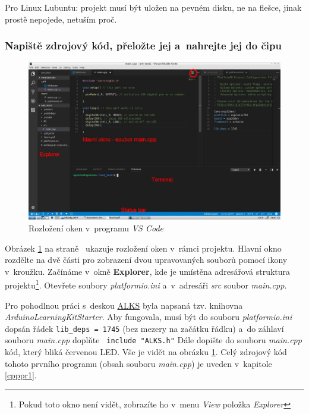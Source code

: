  Pro Linux Lubuntu: projekt musí být uložen na pevném disku, ne na flešce, jinak prostě nepojede, netuším proč.  
 
 \subsubsection{Napiště zdrojový kód, přeložte jej a~nahrejte jej do čipu}
 
 \begin{figure}[h]
 	\includegraphics[width=\textwidth]{soubory/rozlozeni2.jpg}
 	\caption{Rozložení oken v~programu {\it VS Code}} 
 	\label{fig:vsc_rozlozeni}
 \end{figure}	
 
 \hypertarget{explorer}{}
 Obrázek \ref{fig:vsc_rozlozeni} na straně~\pageref{fig:vsc_rozlozeni} ukazuje rozložení oken v~rámci projektu.
 Hlavní okno  rozdělte na dvě části pro zobrazení dvou upravovaných souborů pomocí ikony v~kroužku.
 Začínáme v~okně {\bf Explorer}, 
 kde je umístěna adresářová struktura projektu\footnote{Pokud toto okno není vidět, zobrazíte ho v~menu {\it View} položka {\it Explorer} }.
 Otevřete soubory {\it platformio.ini} a~v~adresáři {\it src} soubor {\it main.cpp}. 
 
 Pro pohodlnou práci s~deskou \hyperref[alks]{ALKS} byla napsaná tzv. knihovna {\it ArduinoLearningKitStarter}. 
 Aby fungovala, musí být do souboru {\it platformio.ini} dopsán řádek {\tt lib\_deps = 1745} (bez mezery na začátku řádku) a~do záhlaví souboru {\it main.cpp} doplňte
 \verb| include "ALKS.h"|
 Dále dopište do souboru {\it main.cpp} kód, který bliká červenou LED.
 Vše je vidět na obrázku \ref{fig:vsc_rozlozeni}.
 Celý zdrojový kód tohoto prvního programu (obsah souboru {\it main.cpp}) je uveden v~kapitole \ref{cpppr1}.
 

